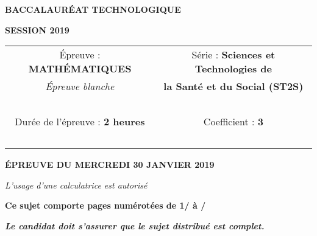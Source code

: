 \begin{center}
	
	{\scshape\LARGE \textbf{BACCALAUR\'EAT TECHNOLOGIQUE} \par}
	\vspace{1cm}
	{\scshape\Large \textbf{SESSION 2019}\par}
	\vspace{1.5cm}
	

	\begin{large}
		\begin{tabular}{|@{\ }c@{\ }|@{\ }c@{\ }|}
		\hline
		\'Epreuve : \textbf{MATH\'EMATIQUES} & Série : \textbf{Sciences et Technologies de}  \\ 
		\textit{\'Epreuve blanche}&  \textbf{la Santé et du Social (ST2S)} \\ \hline
		\ & \ \\
		Durée de l'épreuve : \textbf{2 heures} & Coefficient : \textbf{3} \\ 
		\ & \ \\
		\hline
	\end{tabular}
	\end{large}
		
	\vspace{1cm}
	{\large\bfseries \'EPREUVE DU MERCREDI 30 JANVIER 2019}
	
	\vspace{1cm}
	{\itshape L'usage d'une calculatrice est autorisé\par}
	\vspace{1.5cm}
	{\bfseries Ce sujet comporte \pageref{LastPage} pages numérotées de 1/\pageref{LastPage} à \pageref{LastPage}/\pageref{LastPage} }
	
	
	\vspace{0.5cm}
	{\bfseries\itshape Le candidat doit s'assurer que le sujet distribué est complet. }
	
	\vfill	
	
	
	\vfill

\end{center}
\newpage